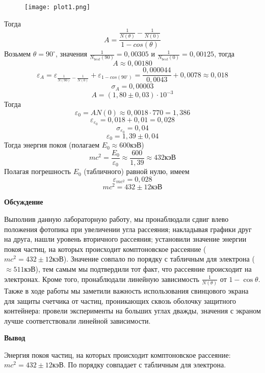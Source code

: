 \documentclass[12pt]{article}
\begin{document}
\begin{figure}[ht!]
    \centering
    \texttt{[image: plot1.png]}
    \label{fig:plot1}
\end{figure}
Тогда
$$A = \frac{\frac{1}{N(\theta)} - \frac{1}{N(0)}}{1 - cos(\theta)}$$
Возьмем $\theta = 90^\circ$, значения $\displaystyle \frac{1}{N_{best}(90)} = 0,00305$ и
$\displaystyle \frac{1}{N_{best}(0)} = 0,00125$, тогда
$$A \approx 0,00180$$
$$\varepsilon_A = \varepsilon_{\frac{1}{N(90)} - \frac{1}{N(0)}} +
\varepsilon_{1 - cos(90^\circ)} = \frac{0,000044}{0,0043} + 0,0078 \approx
0,018$$
$$\sigma_A = 0,00003$$
$$A = (1,80 \pm 0,03) \cdot 10^{-3}$$
Тогда
$$\varepsilon_0 = AN(0) \approx 0,0018 \cdot 770 = 1,386$$
$$\varepsilon_{\varepsilon_0} = 0,018 + 0,01 = 0,028$$
$$\sigma_{\varepsilon_0} = 0,04$$
$$\varepsilon_0 = 1,39 \pm 0,04$$
Тогда энергия покоя (полагаем $E_0 \approx 600\text{кэВ}$)
$$mc^2 = \frac{E_0}{\varepsilon_0} \approx \frac{600}{1,39} \approx 432 \text{кэВ}$$
Полагая погрешность $E_0$ (табличного) равной нулю, имеем
$$\varepsilon_{mc^2} = 0,028$$
$$mc^2 = 432 \pm 12 \text{кэВ}$$
\begin{center}
    \textbf{Обсуждение}
\end{center}
Выполнив данную лабораторную работу, мы пронаблюдали сдвиг влево положения
фотопика при увеличении угла рассеяния; накладывая графики друг на друга, нашли
уровень вторичного рассеяния; установили значение энергии покоя частиц, на
которых происходит комптоновское рассеяние ($mc^2 = 432 \pm 12 \text{кэВ}$).
Значение совпало по порядку с табличным для электрона ($\approx 511
\text{кэВ}$), тем самым мы подтвердили тот факт, что рассеяние происходит на
электронах. Кроме того, пронаблюдали линейную зависимость $\displaystyle \frac{1}{N(\theta)}$ от $1 -
\cos \theta$.
\\
Также в ходе работы мы заметили важность использования свинцового экрана для
защиты счетчика от частиц, проникающих сквозь оболочку защитного контейнера:
провели эксперименты на больших углах дважды, значения с экраном лучше
соответствовали линейной зависимости.
\begin{center}
    \textbf{Вывод}
\end{center}
Энергия покоя частиц, на которых происходит комптоновское рассеяние: $mc^2 = 432
\pm 12 \text{кэВ}$. По порядку совпадает с табличным для электрона.
\end{document}
